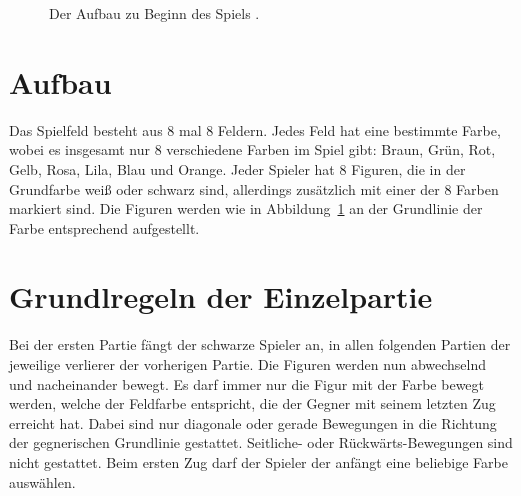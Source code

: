 \documentclass[
	12pt,
	halfparskip,
	a4paper,
	abstract,
	bibliography=totoc,
	liststotoc
]{scrreprt}
\begin{document}
\begin{figure}[htb]
\begin{center}
\end{center}
\caption{Der Aufbau zu Beginn des Spiels \citep{4players}.}
\label{fig:startspiel}
\end{figure}

\section{Aufbau}

Das Spielfeld besteht aus 8 mal 8 Feldern. Jedes Feld hat eine bestimmte Farbe, wobei es insgesamt nur 8 verschiedene Farben im Spiel gibt: Braun, Grün, Rot, Gelb, Rosa, Lila, Blau und Orange. Jeder Spieler hat 8 Figuren, die in der Grundfarbe weiß oder schwarz sind, allerdings zusätzlich mit einer der 8 Farben markiert sind. Die Figuren werden wie in Abbildung~\ref{fig:startspiel} an der Grundlinie der Farbe entsprechend aufgestellt. \citep{huch}

\section{Grundlregeln der Einzelpartie}

Bei der ersten Partie fängt der schwarze Spieler an, in allen folgenden Partien der jeweilige verlierer der vorherigen Partie. Die Figuren werden nun abwechselnd und nacheinander bewegt. Es darf immer nur die Figur mit der Farbe bewegt werden, welche der Feldfarbe entspricht, die der Gegner mit seinem letzten Zug erreicht hat. Dabei sind nur diagonale oder gerade Bewegungen in die Richtung der gegnerischen Grundlinie gestattet. Seitliche- oder Rückwärts-Bewegungen sind nicht gestattet. Beim ersten Zug darf der Spieler der anfängt eine beliebige Farbe auswählen. \citep{kamisado.com}
\end{document}
